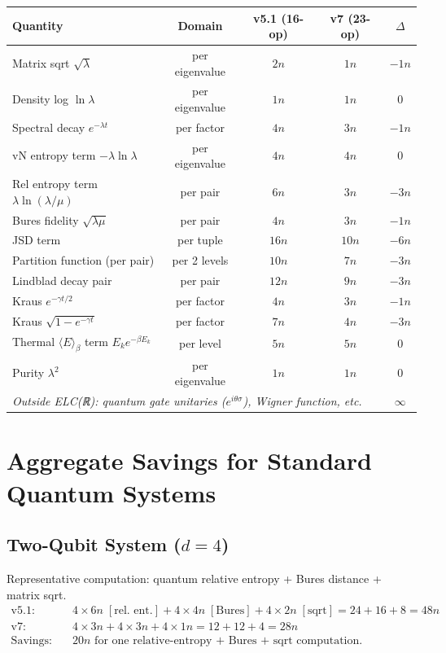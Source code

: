 \documentclass[11pt]{article}
\begin{document}
\begin{center}
\renewcommand{\arraystretch}{1.3}
\begin{tabular}{lcccc}
\toprule
Quantity & Domain & v5.1 (16-op) & v7 (23-op) & $\Delta$\\
\midrule
Matrix sqrt $\sqrt{\lambda}$ & per eigenvalue & $2n$ & $1n$ & $-1n$\\
Density log $\ln\lambda$ & per eigenvalue & $1n$ & $1n$ & $0$\\
Spectral decay $e^{-\lambda t}$ & per factor & $4n$ & $3n$ & $-1n$\\
vN entropy term $-\lambda\ln\lambda$ & per eigenvalue & $4n$ & $4n$ & $0$\\
Rel entropy term $\lambda\ln(\lambda/\mu)$ & per pair & $6n$ & $3n$ & $-3n$\\
Bures fidelity $\sqrt{\lambda\mu}$ & per pair & $4n$ & $3n$ & $-1n$\\
JSD term & per tuple & $16n$ & $10n$ & $-6n$\\
Partition function (per pair) & per 2 levels & $10n$ & $7n$ & $-3n$\\
Lindblad decay pair & per pair & $12n$ & $9n$ & $-3n$\\
Kraus $e^{-\gamma t/2}$ & per factor & $4n$ & $3n$ & $-1n$\\
Kraus $\sqrt{1-e^{-\gamma t}}$ & per factor & $7n$ & $4n$ & $-3n$\\
Thermal $\langle E\rangle_\beta$ term $E_k e^{-\beta E_k}$ & per level & $5n$ & $5n$ & $0$\\
Purity $\lambda^2$ & per eigenvalue & $1n$ & $1n$ & $0$\\
\midrule
\multicolumn{4}{l}{\textit{Outside ELC(ℝ): quantum gate unitaries ($e^{i\theta\sigma}$), Wigner function, etc.}} & $\infty$\\
\bottomrule
\end{tabular}
\end{center}

\section{Aggregate Savings for Standard Quantum Systems}

\subsection{Two-Qubit System ($d=4$)}

Representative computation: quantum relative entropy + Bures distance + matrix sqrt.
\begin{align*}
\text{v5.1:} &\quad 4\times 6n\;[\text{rel. ent.}] + 4\times 4n\;[\text{Bures}] + 4\times 2n\;[\text{sqrt}] = 24+16+8 = 48n\\
\text{v7:}   &\quad 4\times 3n + 4\times 3n + 4\times 1n = 12+12+4 = 28n\\
\text{Savings:} &\quad 20n \text{ for one relative-entropy + Bures + sqrt computation.}
\end{align*}
\end{document}

